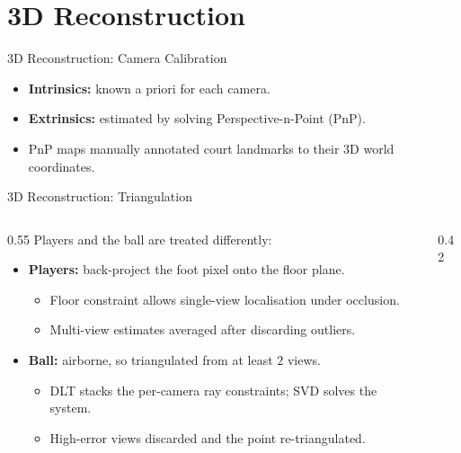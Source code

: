 \section{3D Reconstruction}
\label{sec:reconstruction}
\begin{frame}{3D Reconstruction: Camera Calibration}
\begin{itemize}
  \item \textbf{Intrinsics:} known a priori for each camera.
  \item \textbf{Extrinsics:} estimated by solving Perspective-n-Point (PnP).
  \item PnP maps manually annotated court landmarks to their 3D world coordinates.
\end{itemize}
\end{frame}

\begin{frame}{3D Reconstruction: Triangulation}
\begin{columns}[T]
  \begin{column}{0.55\textwidth}
    Players and the ball are treated differently:
    \begin{itemize}
      \item \textbf{Players:} back-project the foot pixel onto the floor plane.
      \begin{itemize}
        \item Floor constraint allows single-view localisation under occlusion.
        \item Multi-view estimates averaged after discarding outliers.
      \end{itemize}
      \item \textbf{Ball:} airborne, so triangulated from at least $2$ views.
      \begin{itemize}
        \item DLT stacks the per-camera ray constraints; SVD solves the system.
        \item High-error views discarded and the point re-triangulated.
      \end{itemize}
    \end{itemize}
  \end{column}
  \begin{column}{0.42\textwidth}
    \videobox
  \end{column}
\end{columns}
\end{frame}

